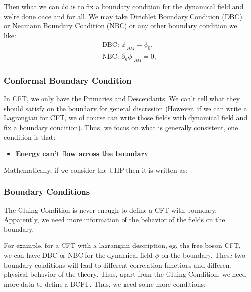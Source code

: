 Then what we can do is to fix a boundary condition for the dynamical
field and we're done once and for all. We may take Dirichlet Boundary
Condition (DBC) or Neumann Boundary Condition (NBC) or any other
boundary condition we like:
\begin{align}
  & \text{DBC: } \phi|_{\partial M} = \phi_0, \\
  & \text{NBC: } \partial_n \phi|_{\partial M} = 0,
\end{align}

\subsubsection{Conformal Boundary Condition}

In CFT, we only have the Primaries and Descendants. We can't tell
what they should satisfy on the boundary for general discussion
(However, if we can write a Lagrangian for CFT, we of course can
  write those fields with dynamical field and fix a boundary
condition). Thus, we focus on what is generally consistent, one
condition is that:
\begin{itemize}
  \item \textbf{Energy can't flow across the boundary}
\end{itemize}
Mathematically, if we consider the UHP then it is written as:

\subsubsection{Boundary Conditions}

The Gluing Condition is never enough to define a CFT with boundary.
Apparently, we need more information of the behavior of the fields on
the boundary.

For example, for a CFT with a lagrangian description, eg. the free
boson CFT, we can have DBC or NBC for the dynamical field $ \phi $ on
the boundary. These two boundary conditions will lead to different
correlation functions and different physical behavior of the theory.
Thus, apart from the Gluing Condition, we need more data to define a
BCFT. Thus, we need some more conditions:

